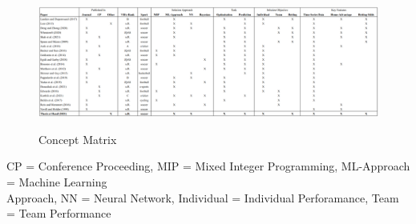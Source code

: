 \clearpage\pagestyle{empty} %
\begin{landscape} %
\begin{figure}[h]
    \caption{Concept Matrix}
    \centering
    \includegraphics[width=25cm]{chapter/3_literature_review/section/matrix.png}
    \label{tab:concept_matrix}
\end{figure}
\footnotesize \noindent CP = Conference Proceeding, MIP = Mixed Integer Programming, ML-Approach = Machine Learning \\
Approach, NN = Neural Network, Individual = Individual Perforamance, Team = Team Performance 

\restoregeometry %

\end{landscape}
\pagestyle{scrheadings} %